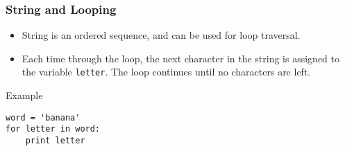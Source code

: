 \documentclass{beamer}
\newcommand{\beforeverb}{\footnotesize}
\newcommand{\afterverb}{\normalsize}
\begin{document}
\begin{frame}[fragile]
\frametitle{String and Looping}
\begin{itemize}
\item String is an ordered sequence, and can be used for \alert{loop traversal}. 

\item Each time through the loop, the next character in the string is assigned
to the variable {\tt letter}.  The loop continues until no characters are
left.
\end{itemize}
\begin{block}{Example}
\beforeverb
\begin{verbatim}
word = 'banana'
for letter in word:
    print letter
\end{verbatim}
\afterverb
\end{block}

\end{frame}
\end{document}
